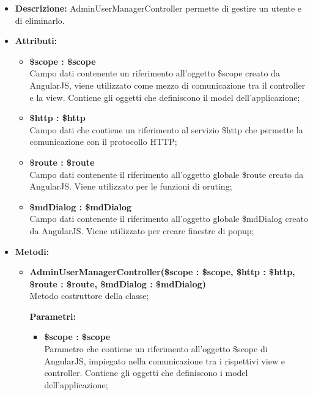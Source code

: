 \begin{itemize}
	\item \textbf{Descrizione:} AdminUserManagerController permette di gestire un utente e di eliminarlo.
	\item \textbf{Attributi:}
	\begin{itemize}
		
		\item \textbf{\$scope : \$scope}\\
		Campo dati contenente un riferimento all'oggetto \$scope creato da AngularJS, viene utilizzato come mezzo di comunicazione tra il controller e la view. Contiene gli oggetti che definiscono il model dell'applicazione;
		
		\item \textbf{\$http : \$http }\\
		Campo dati che contiene un riferimento al servizio \$http che permette la comunicazione con il protocollo HTTP;
		
		\item \textbf{\$route : \$route }\\
		Campo dati contenente il riferimento all'oggetto globale \$route creato da AngularJS. Viene utilizzato per le funzioni di oruting;
		
		\item \textbf{\$mdDialog : \$mdDialog }\\
		Campo dati contenente il riferimento all'oggetto globale \$mdDialog creato da AngularJS. Viene utilizzato per creare finestre di popup;
		
		
	\end{itemize}
	\item \textbf{Metodi:}
	\begin{itemize}
		
		\item \textbf{AdminUserManagerController(\$scope : \$scope, \$http : \$http, \$route : \$route, \$mdDialog : \$mdDialog)}\\
		Metodo costruttore della classe;
		\begin{description}
			\item[\textbf{Parametri:}]
		\end{description}
		\begin{itemize}
			\item \textbf{\$scope : \$scope}\\
			Parametro che contiene un riferimento all'oggetto \$scope di AngularJS, impiegato nella comunicazione tra i rispettivi view e controller. Contiene gli oggetti che definiscono i model dell'applicazione;
			

\end{itemize}
\end{itemize}
\end{itemize}
